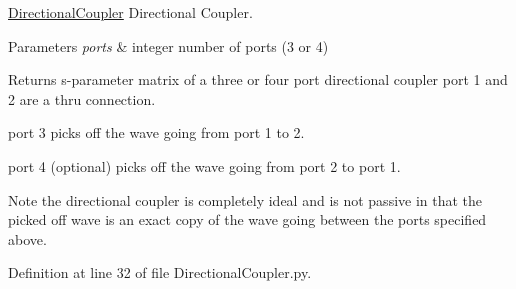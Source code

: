 \hyperlink{namespaceSignalIntegrity_1_1Devices_1_1DirectionalCoupler}{Directional\+Coupler} Directional Coupler. 


\begin{DoxyParams}{Parameters}
{\em ports} & integer number of ports (3 or 4) \\
\hline
\end{DoxyParams}
\begin{DoxyReturn}{Returns}
s-\/parameter matrix of a three or four port directional coupler port 1 and 2 are a thru connection.
\end{DoxyReturn}
port 3 picks off the wave going from port 1 to 2.

port 4 (optional) picks off the wave going from port 2 to port 1.

\begin{DoxyNote}{Note}
the directional coupler is completely ideal and is not passive in that the picked off wave is an exact copy of the wave going between the ports specified above. 
\end{DoxyNote}


Definition at line 32 of file Directional\+Coupler.\+py.

